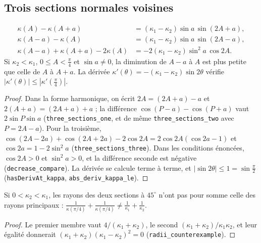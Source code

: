 \subsection*{Trois sections normales voisines}

\begin{enonce}
\begin{align*}
\kappa(A) - \kappa(A+a) &= (\kappa_1-\kappa_2)\sin a\,\sin(2A+a), \\
\kappa(A-a) - \kappa(A) &= (\kappa_1-\kappa_2)\sin a\,\sin(2A-a), \\
\kappa(A-a) + \kappa(A+a) - 2\kappa(A) &= -2(\kappa_1-\kappa_2)\sin^2 a\,\cos 2A .
\end{align*}
Si $\kappa_2 < \kappa_1$, $0 \leq A < \frac\pi4$ et $\sin a \neq 0$, la diminution de $A - a$ à $A$ est plus petite que celle de $A$ à $A + a$. La dérivée $\kappa'(\theta) = -(\kappa_1 - \kappa_2)\sin 2\theta$ vérifie $|\kappa'(\theta)| \leq |\kappa'(\frac\pi4)|$.
\end{enonce}

\begin{proof}
Dans la forme harmonique, on écrit $2A = (2A + a) - a$ et $2(A+a) = (2A + a) + a$ ; la différence $\cos(P - a) - \cos(P + a)$ vaut $2\sin P\sin a$ (\texttt{three\_sections\_one}, et de même \texttt{three\_sections\_two} avec $P = 2A - a$). Pour la troisième, $\cos(2A - 2a) + \cos(2A + 2a) - 2\cos 2A = 2\cos 2A(\cos 2a - 1)$ et $\cos 2a = 1 - 2\sin^2a$ (\texttt{three\_sections\_three}). Dans les conditions énoncées, $\cos 2A > 0$ et $\sin^2a > 0$, et la différence seconde est négative (\texttt{decrease\_compare}). La dérivée se calcule terme à terme, et $|\sin 2\theta| \leq 1 = \sin\frac\pi2$ (\texttt{hasDerivAt\_kappa}, \texttt{abs\_deriv\_kappa\_le}).
\end{proof}

\begin{contrexemple}
Si $0 < \kappa_2 < \kappa_1$, les rayons des deux sections à $45^\circ$ n'ont pas pour somme celle des rayons principaux : $\frac1{\kappa(\pi/4)} + \frac1{\kappa(\pi/4)} \neq \frac1{\kappa_1} + \frac1{\kappa_2}$.
\end{contrexemple}

\begin{proof}
Le premier membre vaut $4/(\kappa_1 + \kappa_2)$, le second $(\kappa_1 + \kappa_2)/\kappa_1\kappa_2$, et leur égalité donnerait $(\kappa_1 + \kappa_2)(\kappa_1 - \kappa_2)^2 = 0$ (\texttt{radii\_counterexample}).
\end{proof}

